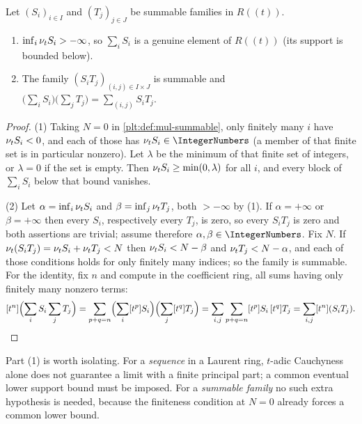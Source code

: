 \begin{lemma}
\label{plt:lem:mul-summable}
Let $(S_i)_{i\in I}$ and $(T_j)_{j\in J}$ be summable families in $R((t))$.
\begin{enumerate}
\item $\inf_i\nu_{t} S_i>-\infty$, so $\sum_iS_i$ is a genuine element of
$R((t))$ (its support is bounded below).
\item The family $(S_iT_j)_{(i,j)\in I\times J}$ is summable and
$\bigl(\sum_iS_i\bigr)\bigl(\sum_jT_j\bigr)=\sum_{(i,j)}S_iT_j$.
\end{enumerate}
\end{lemma}

\begin{proof}
(1) Taking $N=0$ in \cref{plt:def:mul-summable}, only finitely many $i$ have
$\nu_{t} S_i<0$, and each of those has $\ordt S_i\in\IntegerNumbers$ (a member
of that finite set is in particular nonzero).  Let $\lambda$ be the minimum of
that finite set of integers, or $\lambda=0$ if the set is empty.  Then
$\nu_{t} S_i\ge\min(0,\lambda)$ for all $i$, and every block of
$\sum_iS_i$ below that bound vanishes.

(2) Let $\alpha=\inf_i\nu_{t} S_i$ and $\beta=\inf_j\nu_{t} T_j$, both
$>-\infty$ by (1).  If $\alpha=+\infty$ or $\beta=+\infty$ then every $S_i$,
respectively every $T_j$, is zero, so every $S_iT_j$ is zero and both
assertions are trivial; assume therefore $\alpha,\beta\in\IntegerNumbers$.
Fix $N$.  If $\nu_{t}(S_iT_j)=\nu_{t} S_i+\nu_{t} T_j<N$ then
$\nu_{t} S_i<N-\beta$ and $\nu_{t} T_j<N-\alpha$, and each of those conditions
holds for only finitely many indices; so the family is summable.  For the
identity, fix $n$ and compute in the coefficient ring, all sums having only
finitely many nonzero terms:
\[
 [t^n]\Bigl(\sum_iS_i\sum_jT_j\Bigr)
 =\sum_{p+q=n}\Bigl(\sum_i[t^p]S_i\Bigr)\Bigl(\sum_j[t^q]T_j\Bigr)
 =\sum_{i,j}\sum_{p+q=n}[t^p]S_i\,[t^q]T_j
 =\sum_{i,j}[t^n](S_iT_j).
\]
\end{proof}

\begin{remark}
\label{plt:rmk:mul-summable-vs-cauchy}
Part (1) is worth isolating.  For a \emph{sequence} in a Laurent ring,
$t$-adic Cauchyness alone does not guarantee a limit with a finite principal
part; a common eventual lower support bound must be imposed.  For a
\emph{summable family} no such extra hypothesis is needed, because the
finiteness condition at $N=0$ already forces a common lower bound.
\end{remark}

